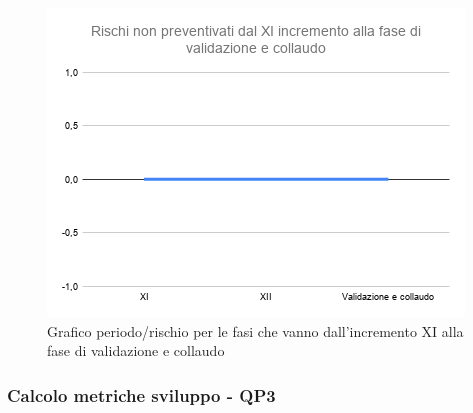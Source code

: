 	\begin{figure}[H]
			\centering
			\includegraphics[width=0.8\linewidth]{./res/images/RischiNonPrevent_5.png}
			\caption{Grafico periodo/rischio per le fasi che vanno dall'incremento XI alla fase di validazione e collaudo}
			\label{fig:Grafico periodo/rischio per le fasi che vanno dall'incremento XI alla fase di validazione e collaudo}
	\end{figure}

\subsubsection{Calcolo metriche sviluppo - QP3}
